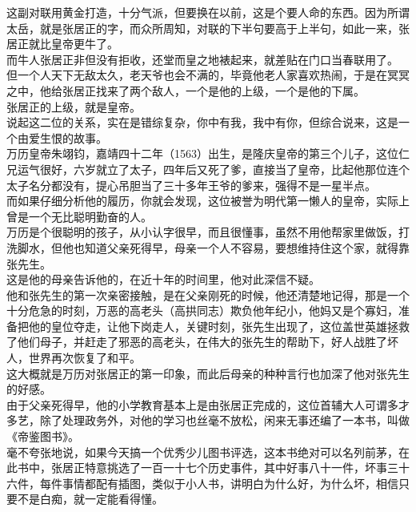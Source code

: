 \begin{multicols}{\theparacolNo}
这副对联用黄金打造，十分气派，但要换在以前，这是个要人命的东西。因为所谓太岳，就是张居正的字，而众所周知，对联的下半句要高于上半句，如此一来，张居正就比皇帝更牛了。\\

而牛人张居正非但没有拒收，还堂而皇之地裱起来，就差贴在门口当春联用了。\\

但一个人天下无敌太久，老天爷也会不满的，毕竟他老人家喜欢热闹，于是在冥冥之中，他给张居正找来了两个敌人，一个是他的上级，一个是他的下属。\\

张居正的上级，就是皇帝。\\

说起这二位的关系，实在是错综复杂，你中有我，我中有你，但综合说来，这是一个由爱生恨的故事。\\

万历皇帝朱翊钧，嘉靖四十二年（1563）出生，是隆庆皇帝的第三个儿子，这位仁兄运气很好，六岁就立了太子，四年后又死了爹，直接当了皇帝，比起他那位连个太子名分都没有，提心吊胆当了三十多年王爷的爹来，强得不是一星半点。\\

而如果仔细分析他的履历，你就会发现，这位被誉为明代第一懒人的皇帝，实际上曾是一个无比聪明勤奋的人。\\

万历是个很聪明的孩子，从小认字很早，而且很懂事，虽然不用他帮家里做饭，打洗脚水，但他也知道父亲死得早，母亲一个人不容易，要想维持住这个家，就得靠张先生。\\

这是他的母亲告诉他的，在近十年的时间里，他对此深信不疑。\\

他和张先生的第一次亲密接触，是在父亲刚死的时候，他还清楚地记得，那是一个十分危急的时刻，万恶的高老头（高拱同志）欺负他年纪小，他妈又是个寡妇，准备把他的皇位夺走，让他下岗走人，关键时刻，张先生出现了，这位盖世英雄拯救了他们母子，并赶走了邪恶的高老头，在伟大的张先生的帮助下，好人战胜了坏人，世界再次恢复了和平。\\

这大概就是万历对张居正的第一印象，而此后母亲的种种言行也加深了他对张先生的好感。\\

由于父亲死得早，他的小学教育基本上是由张居正完成的，这位首辅大人可谓多才多艺，除了处理政务外，对他的学习也丝毫不放松，闲来无事还编了一本书，叫做《帝鉴图书》。\\

毫不夸张地说，如果今天搞一个优秀少儿图书评选，这本书绝对可以名列前茅，在此书中，张居正特意挑选了一百一十七个历史事件，其中好事八十一件，坏事三十六件，每件事情都配有插图，类似于小人书，讲明白为什么好，为什么坏，相信只要不是白痴，就一定能看得懂。\\


\end{multicols}
